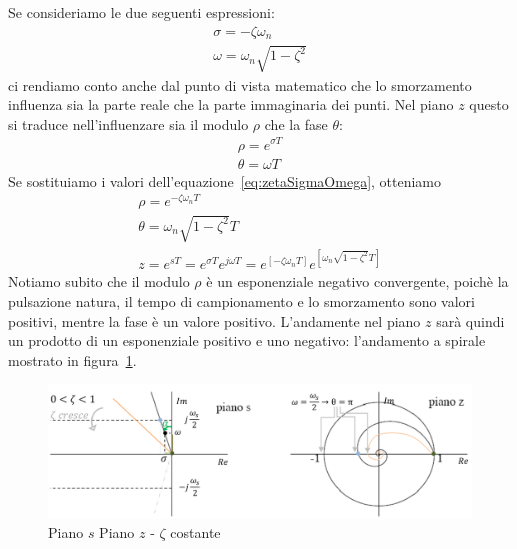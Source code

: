 \documentclass[a4paper]{report}
\begin{document}
Se consideriamo le due seguenti espressioni:
\begin{equation}\label{eq:zetaSigmaOmega}
\begin{array}{l}
  \sigma = - \zeta \omega_n\\
  \omega = \omega_n \sqrt{1 - \zeta^2}
\end{array}
\end{equation}
ci rendiamo conto anche dal punto di vista matematico che lo
smorzamento influenza sia la parte reale che la parte immaginaria dei
punti. Nel piano $z$ questo si traduce nell'influenzare sia il modulo
$\rho$ che la fase $\theta$:
\[
\begin{array}{l}
  \rho = e^{\sigma T}\\
  \theta = \omega T
\end{array}
\]
Se sostituiamo i valori dell'equazione~\ref{eq:zetaSigmaOmega}, otteniamo
\begin{equation}
  \begin{array}{l}
    \rho = e^{- \zeta \omega_n T}\\
    \theta = \omega_n \sqrt{1 - \zeta^2} T\\
    z = e^{sT} = e^{\sigma T}e^{j \omega T} = e^{[- \zeta \omega_n T]}
    e^{[\omega_n \sqrt{1 - \zeta^2}T]}
  \end{array}
\end{equation}
Notiamo subito che il modulo $\rho$ \`e un esponenziale negativo
convergente, poich\`e la pulsazione natura, il tempo di campionamento
e lo smorzamento sono valori positivi, mentre la fase \`e un valore
positivo. L'andamente nel piano $z$ sar\`a quindi un prodotto di un
esponenziale positivo e uno negativo: l'andamento a spirale mostrato
in figura~\ref{fig:pianoSsmorzamentoCostante}.
\begin{figure}[!h]
  \begin{center}
    \includegraphics[scale=0.3]{./figures/pianoSsmorzamentoCostante.png}
    \caption{Piano $s$ Piano $z$ - $\zeta$
      costante}\label{fig:pianoSsmorzamentoCostante}
  \end{center}
\end{figure}
\end{document}
